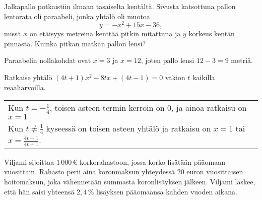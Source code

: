 \begin{tehtavasivu}
\begin{tehtava}
	Jalkapallo potkaistiin ilmaan tasaiselta kentältä. Sivusta katsottuna pallon lentorata oli paraabeli, jonka yhtälö oli muotoa
	$$y=-x^2+15x-36,$$
	missä $x$ on etäisyys metreinä kenttää pitkin mitattuna ja $y$ korkeus kentän pinnasta. Kuinka pitkan matkan pallon lensi?
	\begin{vastaus}
		Paraabelin nollakohdat ovat $x=3$ ja $x=12$, joten pallo lensi $12-3 = 9$ metriä. 
	\end{vastaus}
\end{tehtava}

\begin{tehtava}
Ratkaise yhtälö $(4t+1)x^2-8tx+(4t-1)=0$ vakion $t$ kaikilla reaaliarvoilla.
	\begin{vastaus} \begin{tabular}{l}
		Kun $t=-\frac{1}{4}$, toisen asteen termin kerroin on $0$, ja ainoa ratkaisu on $x = 1$  \\
		Kun $t \neq \frac{1}{4}$ kyseessä on toisen asteen yhtälö ja ratkaisu on $x= 1$ tai $x=\frac{4t-1}{4t+1}$. 	
		\end{tabular}
    \end{vastaus}
\end{tehtava}

\begin{tehtava}
	Viljami sijoittaa $1\,000$\,€ korkorahastoon, jossa korko lisätään pääomaan vuosittain. Rahasto perii aina koronmaksun yhteydessä $20$ euron vuosittaisen hoitomaksun, joka vähennetään summasta koronlisäyksen jälkeen. Viljami laskee, että hän saisi yhteensä $2,4\,\%$ lisäyksen pääomaansa kahden vuoden aikana.
        \begin{alakohdat}
        \end{alakohdat}
	\begin{vastaus}
	    \begin{alakohdat}
	    \end{alakohdat}
	\end{vastaus}
\end{tehtava}


\end{tehtavasivu}
